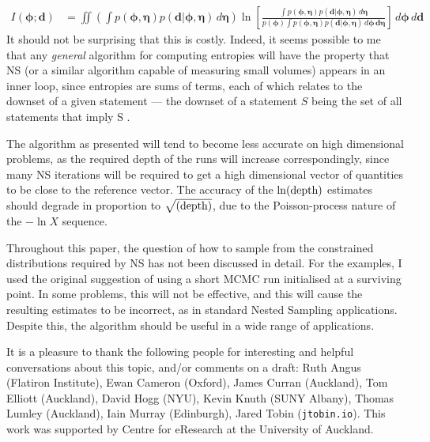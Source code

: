 \documentclass[entropy,article,accept,oneauthor,pdftex,10pt,a4paper]{mdpi}
\renewcommand{\d}{\boldsymbol{d}}
\newcommand{\bphi}{\boldsymbol{\phi}}
\newcommand{\boldeta}{\boldsymbol{\eta}}
\newcommand{\depth}{(\textnormal{depth})}
\begin{document}
\begin{align}
I(\bphi; \d) &= \iint
  \left(\int p(\bphi, \boldeta)p(\d | \bphi, \boldeta) \, d\boldeta\right)
                        \ln \left[
  \frac{\int p(\bphi, \boldeta)p(\d | \bphi, \boldeta) \, d\boldeta}
{p(\bphi)\int p(\bphi, \boldeta)p(\d | \bphi, \boldeta) \, d\bphi \, \d\boldeta}\right]
                        \, d\bphi \, d\d
\end{align}
It should not be surprising that this is costly. Indeed, it seems possible
to me that any {\em general} algorithm for computing entropies will have the
property that NS (or a similar algorithm capable of measuring small volumes)
appears in an inner loop, since entropies are sums of terms, each of which
relates to the downset of a given statement --- the downset of a statement
$S$ being the set of all statements that imply S \citep{knuth_questions}.

The algorithm as presented will tend to become less accurate on high dimensional
problems, as the required depth of the runs will increase correspondingly,
since many NS iterations will be required to get a high dimensional vector
of quantities to be close to the reference vector.
The accuracy of the $\ln\depth$ estimates should degrade in proportion to
$\sqrt{\depth}$, due to the Poisson-process nature of the $-\ln X$ sequence.

Throughout this paper, the question of how to sample from the constrained
distributions required by NS has not been discussed in detail. For the examples,
I used the original \citet{skilling2006nested} suggestion of using a short MCMC run
initialised at a surviving point. In some problems, this will not be effective,
and this will cause the resulting estimates to be incorrect, as in standard
Nested Sampling applications. Despite this, the algorithm should be
useful in a wide range of applications.

It is a pleasure to thank the following people for interesting and helpful
conversations about this topic, and/or comments on a draft:
Ruth Angus (Flatiron Institute),
Ewan Cameron (Oxford), James Curran (Auckland), Tom Elliott (Auckland),
David Hogg (NYU), Kevin Knuth (SUNY Albany),
Thomas Lumley (Auckland),
Iain Murray (Edinburgh), Jared Tobin ({\tt jtobin.io}).
This work was supported by Centre for eResearch
at the University of Auckland.


\end{document}
